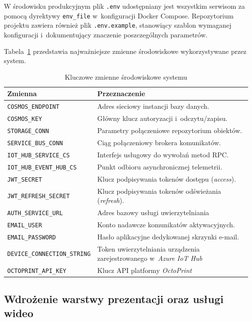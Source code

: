 \documentclass[a4paper,12pt,reqno]{article}
\begin{document}
W środowisku produkcyjnym plik \texttt{.env} udostępniany jest wszystkim serwisom za pomocą dyrektywy \texttt{env\_file} w~konfiguracji Docker Compose. Repozytorium projektu zawiera również plik \texttt{.env.example}, stanowiący szablon wymaganej konfiguracji i~dokumentujący znaczenie poszczególnych parametrów.

Tabela~\ref{tab:env_variables} przedstawia najważniejsze zmienne środowiskowe wykorzystywane przez system.

\begin{table}[h!]
	\centering
	\caption{Kluczowe zmienne środowiskowe systemu}
	\label{tab:env_variables}
	\begin{tabular}{lp{9cm}}
		\toprule
		\textbf{Zmienna} & \textbf{Przeznaczenie} \\
		\midrule
		\texttt{COSMOS\_ENDPOINT} & Adres sieciowy instancji bazy danych. \\
		\texttt{COSMOS\_KEY} & Główny klucz autoryzacji i~odczytu/zapisu. \\
		\texttt{STORAGE\_CONN} & Parametry połączeniowe repozytorium obiektów. \\
		\texttt{SERVICE\_BUS\_CONN} & Ciąg połączeniowy brokera komunikatów.\\
		\texttt{IOT\_HUB\_SERVICE\_CS} & Interfejs usługowy do wywołań metod RPC. \\
		\texttt{IOT\_HUB\_EVENT\_HUB\_CS} & Punkt odbioru asynchronicznej telemetrii. \\
		\texttt{JWT\_SECRET} & Klucz podpisywania tokenów dostępu (\textit{access}). \\
		\texttt{JWT\_REFRESH\_SECRET} & Klucz podpisywania tokenów odświeżania (\textit{refresh}). \\
		\texttt{AUTH\_SERVICE\_URL} & Adres bazowy usługi uwierzytelniania \\
		\texttt{EMAIL\_USER} & Konto nadawcze komunikatów aktywacyjnych. \\
		\texttt{EMAIL\_PASSWORD} & Hasło aplikacyjne dedykowanej skrzynki e-mail. \\
		\texttt{DEVICE\_CONNECTION\_STRING} & Token uwierzytelniania urządzenia zarejestrowanego w~\textit{Azure IoT Hub} \\
		\texttt{OCTOPRINT\_API\_KEY} & Klucz API platformy \textit{OctoPrint} \\
		\bottomrule
	\end{tabular}
\end{table}


\subsection{Wdrożenie warstwy prezentacji oraz usługi wideo}
\end{document}
